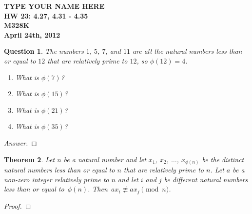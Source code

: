 \documentclass[12pt,leqno]{article}
\numberwithin{equation}{section}
\newtheorem{thm}{Theorem}[section]
\newtheorem{ques}[thm]{Question}
\theoremstyle{definition}
\begin{document}
\thispagestyle{plain}
\begin{flushright}
\large{\textbf{TYPE YOUR NAME HERE \\
HW 23: 4.27, 4.31 - 4.35\\
M328K \\
April 24th, 2012 \\}}
\end{flushright}

\markboth{}{} \setcounter{section}{0} \baselineskip=18pt

\setcounter{tocdepth}{4}



\setcounter{section}{4}

\setcounter{thm}{26}

\begin{ques}
The numbers $1$, $5$, $7$, and $11$ are all the natural numbers less
than or equal to $12$ that are relatively prime to $12$, so
$\phi(12) = 4$.
\begin{enumerate}
\item What is $\phi(7)$?
\item What is $\phi(15)$?
\item What is $\phi(21)$?
\item What is $\phi(35)$?
\end{enumerate}
\end{ques}
\begin{proof}[Answer]
\end{proof}

\setcounter{thm}{30}

\begin{thm}
Let $n$ be a natural number and let $x_1$, $x_2$, $\hdots$,
$x_{\phi(n)}$ be the distinct natural numbers less than or equal to
$n$ that are relatively prime to $n$.  Let $a$ be a non-zero integer
relatively prime to $n$ and let $i$ and $j$ be different natural
numbers less than or equal to~$\phi(n)$.  Then~$ax_i \not \equiv
ax_j \pmod{n}$.
\end{thm}
\begin{proof}[Proof]
\end{proof}
\end{document}
